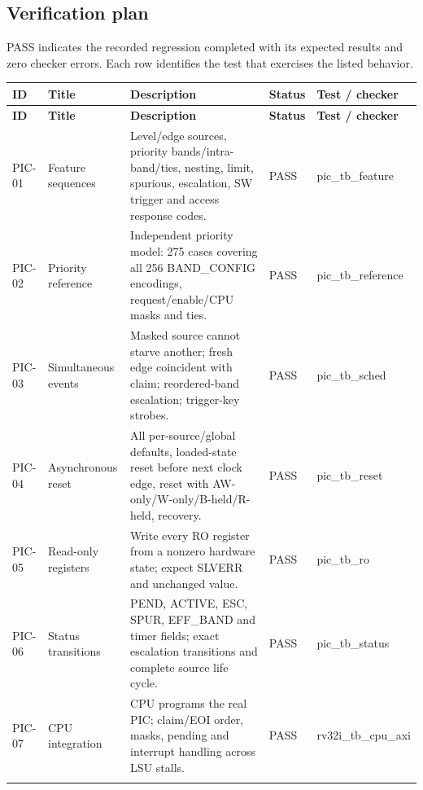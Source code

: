 \documentclass[11pt]{article}
\begin{document}
\subsection{Verification plan}
\noindent PASS indicates the recorded regression completed with its expected results and zero checker errors. Each row identifies the test that exercises the listed behavior.\par\medskip
{\small
\begin{longtable}{@{}L{0.0800\dimexpr\linewidth-48pt\relax}L{0.1600\dimexpr\linewidth-48pt\relax}L{0.3700\dimexpr\linewidth-48pt\relax}L{0.1000\dimexpr\linewidth-48pt\relax}L{0.2900\dimexpr\linewidth-48pt\relax}@{}}
\toprule
\textbf{ID} & \textbf{Title} & \textbf{Description} & \textbf{Status} & \textbf{Test / checker} \\ \midrule
\endfirsthead
\toprule
\textbf{ID} & \textbf{Title} & \textbf{Description} & \textbf{Status} & \textbf{Test / checker} \\ \midrule
\endhead
PIC-01 & Feature sequences & Level/edge sources, priority bands/intra-band/ties, nesting, limit, spurious, escalation, SW trigger and access response codes. & PASS & pic\_tb\_feature \\ \addlinespace[3pt]
PIC-02 & Priority reference & Independent priority model: 275 cases covering all 256 BAND\_CONFIG encodings, request/enable/CPU masks and ties. & PASS & pic\_tb\_reference \\ \addlinespace[3pt]
PIC-03 & Simultaneous events & Masked source cannot starve another; fresh edge coincident with claim; reordered-band escalation; trigger-key strobes. & PASS & pic\_tb\_sched \\ \addlinespace[3pt]
PIC-04 & Asynchronous reset & All per-source/global defaults, loaded-state reset before next clock edge, reset with AW-only/W-only/B-held/R-held, recovery. & PASS & pic\_tb\_reset \\ \addlinespace[3pt]
PIC-05 & Read-only registers & Write every RO register from a nonzero hardware state; expect SLVERR and unchanged value. & PASS & pic\_tb\_ro \\ \addlinespace[3pt]
PIC-06 & Status transitions & PEND, ACTIVE, ESC, SPUR, EFF\_BAND and timer fields; exact escalation transitions and complete source life cycle. & PASS & pic\_tb\_status \\ \addlinespace[3pt]
PIC-07 & CPU integration & CPU programs the real PIC; claim/EOI order, masks, pending and interrupt handling across LSU stalls. & PASS & rv32i\_tb\_cpu\_axi \\ \addlinespace[3pt]

\end{longtable}}
\end{document}
